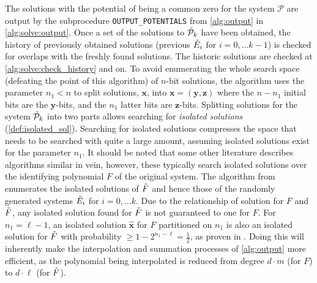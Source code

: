 The solutions with the potential of being a common zero for the system $\mathcal{P}$ are output by the subprocedure \texttt{OUTPUT\_POTENTIALS} from \cref{alg:output} in \cref{alg:solve:output}. Once a set of the solutions to $\Tilde{\mathcal{P}}_k$ have been obtained, the history of previously obtained solutions (previous $\Tilde{E}_i$ for $i = 0, \dots k - 1$) is checked for overlaps with the freshly found solutions. The historic solutions are checked at \cref{alg:solve:check_history} and on. To avoid enumerating the whole search space (defeating the point of this algorithm) of $n$-bit solutions, the algorithm uses the parameter $n_1 < n$ to split solutions, $\mathbf{x}$, into $\mathbf{x} = (\mathbf{y}, \mathbf{z})$ where the $n - n_1$ initial bits are the $\mathbf{y}$-bits, and the $n_1$ latter bits are $\mathbf{z}$-bits. Splitting solutions for the system $\Tilde{\mathcal{P}}_k$ into two parts allows searching for \textit{isolated solutions} (\cref{def:isolated_sol}). Searching for isolated solutions compresses the space that needs to be searched with quite a large amount, assuming isolated solutions exist for the parameter $n_1$. It should be noted that some other literature describes algorithms similar in vein, however, these typically search isolated solutions over the identifying polynomial $F$ of the original system. The algorithm from \cite{eurocrypt-2021-30841} enumerates the isolated solutions of $\Tilde{F}$ and hence those of the randomly generated systems $\Tilde{E}_i$ for $i = 0, \dots k$. Due to the relationship of solution for $F$ and $\Tilde{F}$, any isolated solution found for $\Tilde{F}$ is not guaranteed to one for $F$. For $n_1 = \ell - 1$, an isolated solution $\hat{\mathbf{x}}$ for $F$ partitioned on $n_1$ is also an isolated solution for $\Tilde{F}$ with probability $\geq 1 - 2^{n_1 - \ell} = \frac{1}{2}$, as proven in \cite{eurocrypt-2021-30841}. Doing this will inherently make the interpolation and summation processes of \cref{alg:output} more efficient, as the polynomial being interpolated is reduced from degree $d \cdot m$ (for $F$) to $d \cdot \ell$ (for $\Tilde{F}$).

